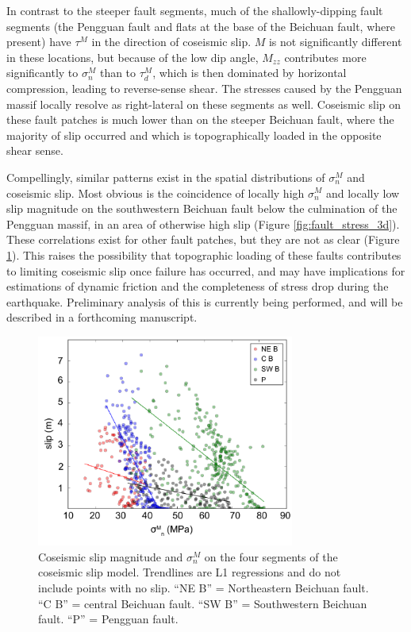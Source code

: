 \documentclass[twocolumn,jgrga]{AGUTeX}
\begin{document}
\begin{article}
In contrast to the steeper fault segments, much of the shallowly-dipping
fault segments (the Pengguan fault and flats at the base of the Beichuan
fault, where present) have $\tau^M$ in the direction of coseismic slip.
$M$ is not significantly different in these
locations, but because of the low dip angle, $M_{zz}$ contributes more
significantly to $\sigma^M_n$ than to $\tau^M_d$, which is then
dominated by horizontal compression, leading to reverse-sense shear.
The stresses caused by the Pengguan massif locally resolve
as right-lateral on these segments as well. Coseismic slip on these
fault patches is much lower than on the steeper Beichuan fault, where
the majority of slip occurred and which is topographically loaded in the
opposite shear sense.

Compellingly, similar patterns exist in the spatial distributions of
$\sigma^M_n$ and coseismic slip. Most obvious is the coincidence of
locally high $\sigma^M_n$ and locally low slip magnitude on the
southwestern Beichuan fault below the culmination of the Pengguan
massif, in an area of otherwise high slip (Figure
\ref{fig:fault_stress_3d}). These correlations exist for other fault
patches, but they are not as clear (Figure
\ref{fig:feng_slip_sig_n_scatter}). This raises the possibility that
topographic loading of these faults contributes to limiting coseismic
slip once failure has occurred, and
may have implications for estimations of dynamic friction and the
completeness of stress drop during the earthquake. Preliminary analysis
of this is currently being performed, and will be described in a
forthcoming manuscript.

\begin{figure}%
\centering
\includegraphics[width=20pc]{../figures/feng_slip_sig_n_scatter.pdf}
\caption{Coseismic slip magnitude and $\sigma^M_n$ on the four segments
of the \citet{feng2010} coseismic slip model. Trendlines are
L1 regressions and do not include points with no slip. ``NE B'' =
Northeastern Beichuan fault. ``C B'' = central Beichuan fault. ``SW B'' =
Southwestern Beichuan fault. ``P'' = Pengguan fault.}
\label{fig:feng_slip_sig_n_scatter}
\end{figure}


\end{article}
\end{document}
